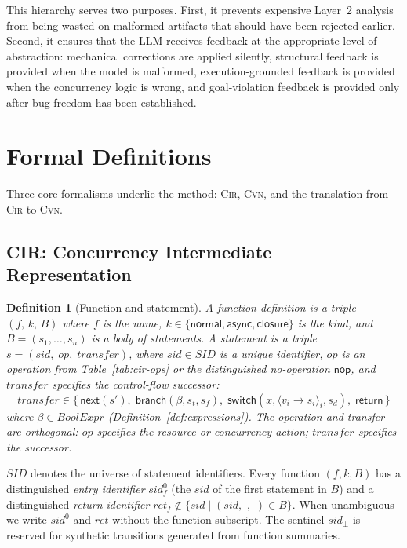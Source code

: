 \documentclass[sigconf]{acmart}
\newtheorem{definition}{Definition}
\begin{document}
This hierarchy serves two purposes. First, it prevents expensive Layer~2 analysis from being wasted on malformed artifacts that should have been rejected earlier. Second, it ensures that the LLM receives feedback at the appropriate level of abstraction: mechanical corrections are applied silently, structural feedback is provided when the model is malformed, execution-grounded feedback is provided when the concurrency logic is wrong, and goal-violation feedback is provided
only after bug-freedom has been established.


\section{Formal Definitions}
\label{sec:formal-defs}

Three core formalisms underlie the method: \textsc{Cir}, \textsc{Cvn}, and the translation from \textsc{Cir} to \textsc{Cvn}.

\subsection{CIR: Concurrency Intermediate Representation}
\label{subsec:cir-def}

\begin{definition}[Function and statement]
\label{def:statement}
A \emph{function definition} is a triple $(f,\,k,\,B)$ where $f$ is the name, $k\in\{\textsf{normal},\textsf{async},\textsf{closure}\}$ is the kind, and $B=(s_1,\dots,s_n)$ is a body of statements.
A \emph{statement} is a triple $s=(\mathit{sid},\;\mathit{op},\;\mathit{transfer})$, where $\mathit{sid}\in\mathit{SID}$ is a unique identifier, $\mathit{op}$ is an operation from Table~\ref{tab:cir-ops} or the distinguished no-operation $\textsf{nop}$, and $\mathit{transfer}$ specifies the control-flow successor:
   \[
      \mathit{transfer} \in
      \bigl\{\,
        \textsf{next}(s'),\;
        \textsf{branch}(\beta,s_t,s_f),\;
        \textsf{switch}(x,\langle v_i\!\to\!s_i\rangle_{i},s_d),\;
        \textsf{return}
      \,\bigr\}
    \]
    where $\beta\in\mathit{BoolExpr}$ (Definition~\ref{def:expressions}). The operation and transfer are orthogonal: $\mathit{op}$ specifies the resource or concurrency action; $\mathit{transfer}$ specifies the successor.
\end{definition}

$\mathit{SID}$ denotes the universe of statement identifiers. Every function $(f,k,B)$ has a distinguished \emph{entry identifier} $\mathit{sid}^{0}_{f}$ (the $\mathit{sid}$ of the first statement in $B$) and a distinguished \emph{return identifier} $\mathit{ret}_{f}\notin\{\mathit{sid}\mid(\mathit{sid},\_,\_)\in B\}$. When unambiguous we write $\mathit{sid}^{0}$ and $\mathit{ret}$ without the function subscript. The sentinel $\mathit{sid}_{\bot}$ is reserved for synthetic transitions generated from function summaries.
\end{document}
